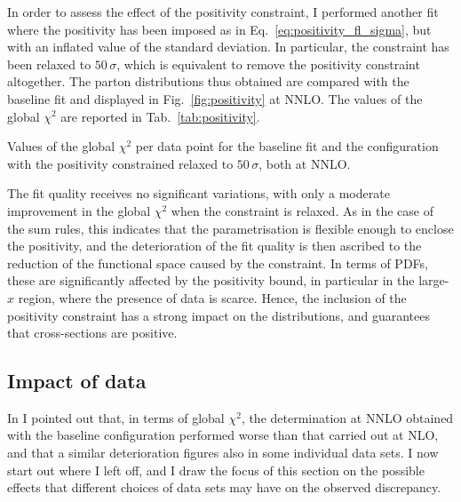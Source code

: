 In order to assess the effect of the positivity constraint, I performed another fit where the positivity has been imposed as in Eq.~\eqref{eq:positivity_fl_sigma}, but with an inflated value of the standard deviation. In particular, the constraint has been relaxed to $50 \, \sigma$, which is equivalent to remove the positivity constraint altogether. The parton distributions thus obtained are compared with the baseline fit and displayed in Fig.~\ref{fig:positivity} at NNLO. The values of the global $\chi^2$ are reported in Tab.~\ref{tab:positivity}.%

\begin{table}[t]
  \centering
  \small
  
  \caption{
    \small
    Values of the global $\chi^2$ per data point for the baseline fit and the configuration with the positivity constrained relaxed to $50 \, \sigma$, both at NNLO.}
  \label{tab:positivity}
\end{table}

The fit quality receives no significant variations, with only a moderate improvement in the global $\chi^2$ when the constraint is relaxed. As in the case of the sum rules, this indicates that the parametrisation is flexible enough to enclose the positivity, and the deterioration of the fit quality is then ascribed to the reduction of the functional space caused by the constraint. In terms of PDFs, these are significantly affected by the positivity bound, in particular in the large-$x$ region, where the presence of data is scarce. Hence, the inclusion of the positivity constraint has a strong impact on the distributions, and guarantees that cross-sections are positive.

\subsection{Impact of data}
\label{sec:study_data}

In  I pointed out that, in terms of global $\chi^2$, the determination at NNLO obtained with the baseline configuration performed worse than that carried out at NLO, and that a similar deterioration figures also in some individual data sets. I now start out where I left off, and I draw the focus of this section on the possible effects that different choices of data sets may have on the observed discrepancy.%

